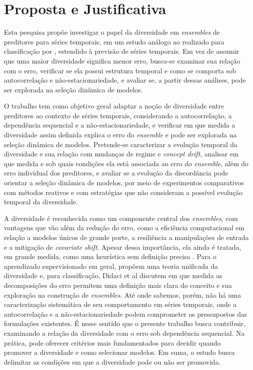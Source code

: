\chapter{Proposta e Justificativa}

Esta pesquisa propõe investigar o papel da diversidade em \textit{ensembles} de
preditores para séries temporais, em um estudo análogo ao realizado para classificação
por \cite{didaciDiversityClassifierEnsembles2013}, estendido à previsão de séries
temporais. Em vez de assumir que uma maior diversidade significa menor erro, busca-se
examinar sua relação com o erro, verificar se ela possui estrutura temporal e como se
comporta sob autocorrelação e não-estacionariedade, e avaliar se, a partir dessas
análises, pode ser explorada na seleção dinâmica de modelos.

O trabalho tem como objetivo geral adaptar a noção de diversidade entre preditores ao
contexto de séries temporais, considerando a autocorrelação, a dependência sequencial e
a não-estacionariedade, e verificar em que medida a diversidade assim definida explica
o erro do \textit{ensemble} e pode ser explorada na seleção dinâmica de modelos.
Pretende-se caracterizar a evolução temporal da diversidade e sua relação com mudanças
de regime e \textit{concept drift}, analisar em que medida e sob quais condições ela
está associada ao erro do \textit{ensemble}, além do erro individual dos preditores, e
avaliar se a evolução da discordância pode orientar a seleção dinâmica de modelos, por
meio de experimentos comparativos com métodos reativos e com estratégias que não
consideram a possível evolução temporal da diversidade.

A diversidade é reconhecida como um componente central dos \textit{ensembles}, com
vantagens que vão além da redução do erro, como a eficiência computacional em relação
a modelos únicos de grande porte, a resiliência a manipulações de entrada e a
mitigação de \textit{covariate shift}. Apesar dessa importância, ela ainda é tratada,
em grande medida, como uma heurística sem definição precisa
\cite{woodUnifiedTheoryDiversity}. Para o aprendizado supervisionado em geral,
\cite{woodUnifiedTheoryDiversity} propõem uma teoria unificada da diversidade e,
para classificação, Didaci et al \cite{didaciDiversityClassifierEnsembles2013} discutem em
que medida as decomposições do erro permitem uma definição mais clara do conceito e
sua exploração na construção de \textit{ensembles}. Até onde sabemos, porém, não há
uma caracterização sistemática de seu comportamento em séries temporais, onde a
autocorrelação e a não-estacionariedade podem comprometer os pressupostos das
formulações existentes. É nesse sentido que o presente trabalho busca contribuir,
examinando a relação da diversidade com o erro sob dependência sequencial. Na prática,
pode oferecer critérios mais fundamentados para decidir quando promover a diversidade e
como selecionar modelos. Em suma, o estudo busca delimitar as condições em que a
diversidade pode ou não ser promovida.

